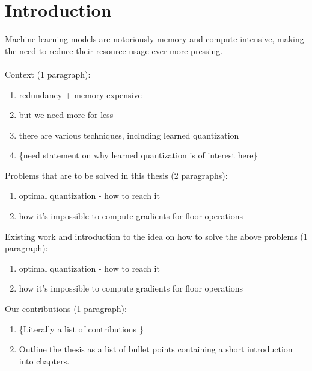 \chapter{Introduction\label{cha:chapter1}}

Machine learning models are notoriously memory and compute intensive, 
making the need to reduce their resource usage ever more pressing.
\\
\\
Context (1 paragraph):
    \begin{enumerate}
        \item redundancy + memory expensive
        \item but we need more for less
        \item there are various techniques, including learned quantization
        \item \{need statement on why learned quantization is of interest here\}
    \end{enumerate}

    


Problems that are to be solved in this thesis (2 paragraphs):
    \begin{enumerate}
        \item optimal quantization - how to reach it
        \item how it's impossible to compute gradients for floor operations
    \end{enumerate}
Existing work and introduction to the idea on how to solve the above problems (1 paragraph):
    \begin{enumerate}
        \item optimal quantization - how to reach it
        \item how it's impossible to compute gradients for floor operations
    \end{enumerate}
Our contributions (1 paragraph):
    \begin{enumerate}
        \item \{Literally a list of contributions \}
        \item Outline the thesis as a list of bullet points containing a short introduction into chapters.
    \end{enumerate}
